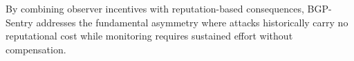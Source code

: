 \begin{table}[t]
\centering
\caption{Comparison of BGP Security Approaches}
\label{tab:related_comparison}
\end{table}

By combining observer incentives with reputation-based consequences, BGP-Sentry addresses the fundamental asymmetry where attacks historically carry no reputational cost while monitoring requires sustained effort without compensation.
